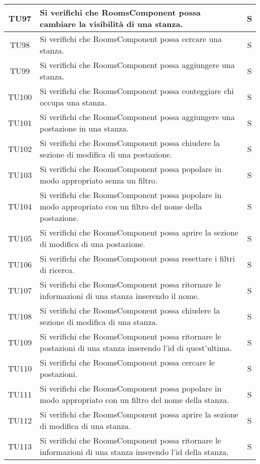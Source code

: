 \begin{center}
\begin{longtable}{|c|p{10cm}|c|}
			TU97 & Si verifichi che RoomsComponent possa cambiare la visibilità di una stanza. & S \\
			\hline
			TU98 & Si verifichi che RoomsComponent possa cercare una stanza. & S \\
			\hline		  
			TU99 & Si verifichi che RoomsComponent possa aggiungere una stanza. & S \\
			\hline
			TU100 & Si verifichi che RoomsComponent possa conteggiare chi occupa una stanza. & S \\
			\hline
			TU101 & Si verifichi che RoomsComponent possa aggiungere una postazione in una stanza. & S \\
			\hline
			TU102 & Si verifichi che RoomsComponent possa chiudere la sezione di modifica di una postazione. & S \\
			\hline
			TU103 & Si verifichi che RoomsComponent possa popolare in modo appropriato senza un filtro. & S \\
			\hline		  
			TU104 & Si verifichi che RoomsComponent possa popolare in modo appropriato con un filtro del nome della postazione. & S \\
			\hline
			TU105 & Si verifichi che RoomsComponent possa aprire la sezione di modifica di una postazione. & S \\
			\hline
			TU106 & Si verifichi che RoomsComponent possa resettare i filtri di ricerca. & S \\
			\hline
			TU107 & Si verifichi che RoomsComponent possa ritornare le informazioni di una stanza inserendo il nome. & S \\
			\hline
			TU108 & Si verifichi che RoomsComponent possa chiudere la sezione di modifica di una stanza. & S \\
			\hline	  
			TU109 & Si verifichi che RoomsComponent possa ritornare le postazioni di una stanza inserendo l’id di quest'ultima. & S \\
			\hline
			TU110 & Si verifichi che RoomsComponent possa cercare le postazioni. & S \\
			\hline
			TU111 & Si verifichi che RoomsComponent possa popolare in modo appropriato con un filtro del nome della stanza. & S \\
			\hline
			TU112 & Si verifichi che RoomsComponent possa aprire la sezione di modifica di una stanza. & S \\
			\hline
			TU113 & Si verifichi che RoomsComponent possa ritornare le informazioni di una stanza inserendo l'id della stanza. & S \\
			\hline
			

\end{longtable}
\end{center}
